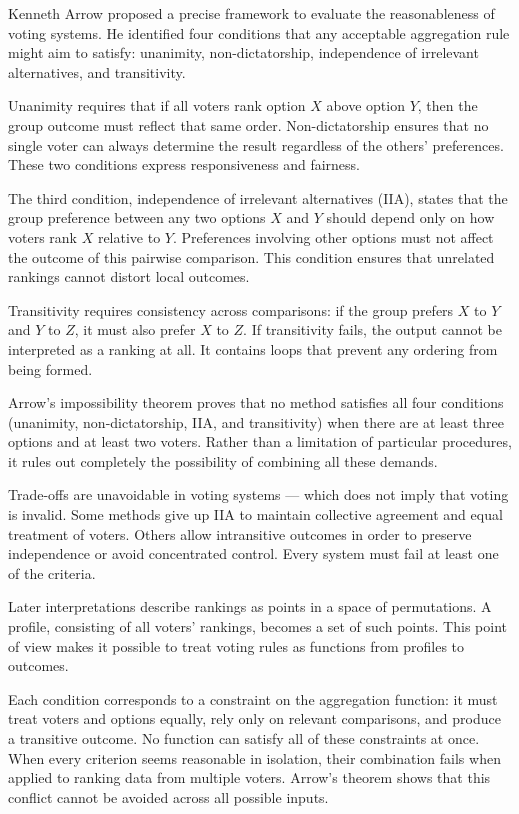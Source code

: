 Kenneth Arrow proposed a precise framework to evaluate the reasonableness of voting systems. He identified four conditions that any acceptable aggregation rule might aim to satisfy: unanimity, non-dictatorship, independence of irrelevant alternatives, and transitivity.

Unanimity requires that if all voters rank option $X$ above option $Y$, then the group outcome must reflect that same order. Non-dictatorship ensures that no single voter can always determine the result regardless of the others' preferences. These two conditions express responsiveness and fairness.

The third condition, independence of irrelevant alternatives (IIA), states that the group preference between any two options $X$ and $Y$ should depend only on how voters rank $X$ relative to $Y$. Preferences involving other options must not affect the outcome of this pairwise comparison. This condition ensures that unrelated rankings cannot distort local outcomes.

Transitivity requires consistency across comparisons: if the group prefers $X$ to $Y$ and $Y$ to $Z$, it must also prefer $X$ to $Z$. If transitivity fails, the output cannot be interpreted as a ranking at all. It contains loops that prevent any ordering from being formed.

Arrow’s impossibility theorem proves that no method satisfies all four conditions (unanimity, non-dictatorship, IIA, and transitivity) when there are at least three options and at least two voters. Rather than a limitation of particular procedures, it rules out completely the possibility of combining all these demands.

Trade-offs are unavoidable in voting systems — which does not imply that voting is invalid. Some methods give up IIA to maintain collective agreement and equal treatment of voters. Others allow intransitive outcomes in order to preserve independence or avoid concentrated control. Every system must fail at least one of the criteria.

Later interpretations describe rankings as points in a space of permutations. A profile, consisting of all voters’ rankings, becomes a set of such points. This point of view makes it possible to treat voting rules as functions from profiles to outcomes.

Each condition corresponds to a constraint on the aggregation function: it must treat voters and options equally, rely only on relevant comparisons, and produce a transitive outcome. No function can satisfy all of these constraints at once. When every criterion seems reasonable in isolation, their combination fails when applied to ranking data from multiple voters. Arrow’s theorem shows that this conflict cannot be avoided across all possible inputs.

